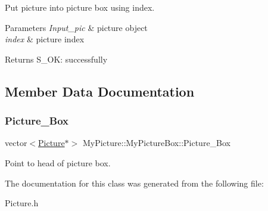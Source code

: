 Put picture into picture box using index. 


\begin{DoxyParams}{Parameters}
{\em Input\+\_\+pic} & picture object \\
\hline
{\em index} & picture index \\
\hline
\end{DoxyParams}
\begin{DoxyReturn}{Returns}
S\+\_\+\+OK\+: successfully 
\end{DoxyReturn}


\subsection{Member Data Documentation}
\mbox{\label{class_my_picture_1_1_my_picture_box_af78a5226e0dcb26d53245c7ea1c8a07d}} 
\subsubsection{\texorpdfstring{Picture\+\_\+\+Box}{Picture\_Box}}
{\footnotesize\ttfamily vector$<$\hyperlink{class_my_picture_1_1_picture}{Picture}$\ast$$>$ My\+Picture\+::\+My\+Picture\+Box\+::\+Picture\+\_\+\+Box\hspace{0.3cm}{\ttfamily [private]}}



Point to head of picture box. 



The documentation for this class was generated from the following file\+:\begin{DoxyCompactItemize}
\item 
Picture.\+h\end{DoxyCompactItemize}
